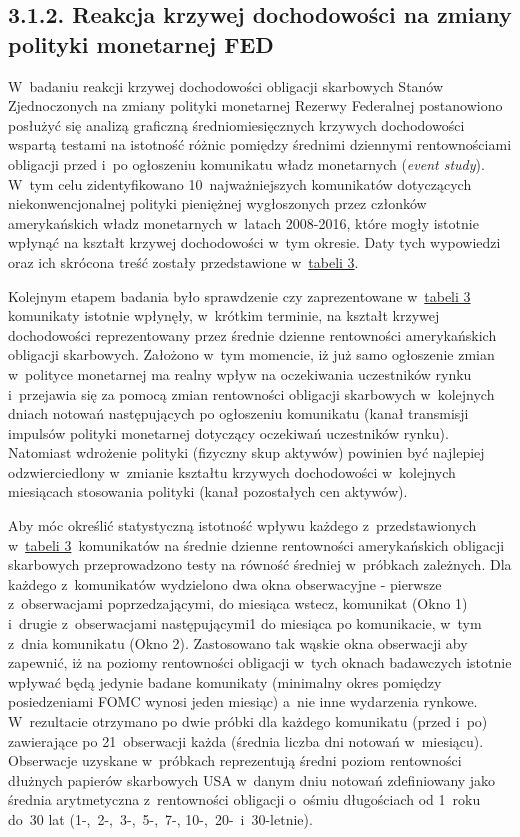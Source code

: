 \subsection*{\normalsize{3.1.2. Reakcja krzywej dochodowości na zmiany polityki monetarnej FED}}

W~badaniu reakcji krzywej dochodowości obligacji skarbowych Stanów Zjednoczonych na zmiany polityki monetarnej Rezerwy Federalnej postanowiono posłużyć się analizą graficzną średniomiesięcznych krzywych dochodowości wspartą testami na istotność różnic pomiędzy średnimi dziennymi rentownościami obligacji przed i~po ogłoszeniu komunikatu władz monetarnych (\textit{event study}). W~tym celu zidentyfikowano 10~najważniejszych komunikatów dotyczących niekonwencjonalnej polityki pieniężnej wygłoszonych przez członków amerykańskich władz monetarnych w~latach 2008-2016, które mogły istotnie wpłynąć na kształt krzywej dochodowości w~tym okresie. Daty tych wypowiedzi oraz ich skrócona treść zostały przedstawione w~\hyperlink{tab2}{tabeli 3}. 

Kolejnym etapem badania było sprawdzenie czy zaprezentowane w~\hyperlink{tab2}{tabeli 3} komunikaty istotnie wpłynęły, w~krótkim terminie, na kształt krzywej dochodowości reprezentowany przez średnie dzienne rentowności amerykańskich obligacji skarbowych. Założono w~tym momencie, iż już samo ogłoszenie zmian w~polityce monetarnej ma realny wpływ na oczekiwania uczestników rynku i~przejawia się za pomocą zmian rentowności obligacji skarbowych w~kolejnych dniach notowań następujących po ogłoszeniu komunikatu (kanał transmisji impulsów polityki monetarnej dotyczący oczekiwań uczestników rynku). Natomiast wdrożenie polityki (fizyczny skup aktywów) powinien być najlepiej odzwierciedlony w~zmianie kształtu krzywych dochodowości w~kolejnych miesiącach stosowania polityki (kanał pozostałych cen aktywów). 

Aby móc określić statystyczną istotność wpływu każdego z~przedstawionych w~\hyperlink{tab2}{tabeli 3}~komunikatów na średnie dzienne rentowności amerykańskich obligacji skarbowych przeprowadzono testy na równość średniej w~próbkach zależnych. Dla każdego z~komunikatów wydzielono dwa okna obserwacyjne - pierwsze z~obserwacjami poprzedzającymi, do miesiąca wstecz, komunikat (Okno 1) i~drugie z~obserwacjami następującymi1 do miesiąca po komunikacie, w~tym z~dnia komunikatu (Okno 2). Zastosowano tak wąskie okna obserwacji aby zapewnić, iż na poziomy rentowności obligacji w~tych oknach badawczych istotnie wpływać będą jedynie badane komunikaty (minimalny okres pomiędzy posiedzeniami \acs{FOMC} wynosi jeden miesiąc) a~nie inne wydarzenia rynkowe. W~rezultacie otrzymano po dwie próbki dla każdego komunikatu (przed i~po) zawierające po 21~obserwacji każda (średnia liczba dni notowań w~miesiącu). Obserwacje uzyskane w~próbkach reprezentują średni poziom rentowności dłużnych papierów skarbowych USA w~danym dniu notowań zdefiniowany jako średnia arytmetyczna z~rentowności obligacji o~ośmiu długościach od 1~roku do~30 lat (1-,~2-,~3-,~5-,~7-, 10-,~20-~i~30-letnie).

